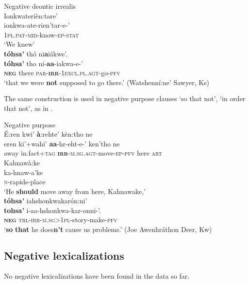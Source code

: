 \documentclass[output=paper,colorlinks,citecolor=brown]{langscibook}
\begin{document}
{\ea\label{ex:moh:59}Negative deontic irrealis\\
    \glll Ionkwaterièn:tare’ \\ 
         ionkwa-ate-rien’tar-e-’ \\ 
         \textsc{1pl.pat-mid}-know-\textsc{ep-stat} \\
    \glt ‘We knew’\\ \medskip 
    \glll  \textbf{tóhsa’} thó ni\textbf{a}iákwe’. \\ 
          \textbf{tóhsa’} tho ni-\textbf{aa}-iakwa-e-’ \\
          \textbf{\textsc{neg}} there \textsc{par-}\textbf{\textsc{irr}}\textsc{-1excl.pl.agt}-go-\textsc{pfv}\\
    \glt  ‘that we were \textbf{not} supposed to go there.’ (Watshenní:ne’ Sawyer, Ks)
\z}

The same construction is used in negative purpose clauses ‘so that not’, ‘in order that not’, as in .

\ea\label{ex:moh:60}Negative purpose\\
    \glll É:ren kwi’ \textbf{à}:rehte’ kèn:tho ne \\ 
          eren ki’+wahi’ \textbf{aa}-hr-eht-e-’ ken’tho ne \\ 
          away in.fact+\textsc{tag} \textbf{\textsc{irr}}\textsc{-m.sg.agt}-move-\textsc{ep-pfv} here \textsc{art} \\
    \glt 
    {\qquad} \glll  Kahnawà:ke \\ 
                    ka-hnaw-a’ke \\ 
                    \textsc{n-}rapids-place\\
    \glt ‘He \textbf{should} move away from here, Kahnawake,’\\  \medskip
    \glll  \textbf{tóhsa’} iahshonkwakarón:ni’ \\ 
          \textbf{tohsa’} i-aa-hshonkwa-kar-onni-’.\\
          \textbf{\textsc{neg}} \textsc{trl-irr-m.sg>1pl}-story-make-\textsc{pfv}\\
    \glt  ‘\textbf{so} \textbf{that} he does\textbf{n’t} cause us problems.’ (Joe Awenhráthon Deer, Kw) 
\z 

\subsection{Negative lexicalizations}
No negative lexicalizations have been found in the data so far.
\end{document}
